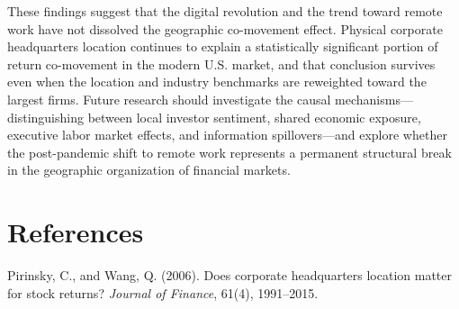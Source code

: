 \documentclass[
  12pt,
]{article}
\begin{document}
These findings suggest that the digital revolution and the trend toward
remote work have not dissolved the geographic co-movement effect.
Physical corporate headquarters location continues to explain a
statistically significant portion of return co-movement in the modern
U.S. market, and that conclusion survives even when the location and
industry benchmarks are reweighted toward the largest firms. Future
research should investigate the causal mechanisms---distinguishing
between local investor sentiment, shared economic exposure, executive
labor market effects, and information spillovers---and explore whether
the post-pandemic shift to remote work represents a permanent structural
break in the geographic organization of financial markets.

\newpage

\section{References}\label{references}

\setlength{\parindent}{0em}
\setlength{\parskip}{0.5em}

Pirinsky, C., and Wang, Q. (2006). Does corporate headquarters location
matter for stock returns? \emph{Journal of Finance}, 61(4), 1991--2015.
\end{document}
